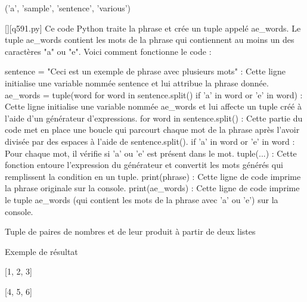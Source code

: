 ('a', 'sample', 'sentence', 'various')
        \par
        \begin{solution}
            \renewcommand{\nomfichier}{q591.py}
            \pythonfile{\chemincode \nomfichier}[][\nomfichier]
            Ce code Python traite la phrase et crée un tuple appelé ae_words. Le tuple ae_words contient les mots de la phrase qui contiennent au moins un des caractères "a" ou "e". Voici comment fonctionne le code :

    sentence = "Ceci est un exemple de phrase avec plusieurs mots" : Cette ligne initialise une variable nommée sentence et lui attribue la phrase donnée.
    ae_words = tuple(word for word in sentence.split() if 'a' in word or 'e' in word) : Cette ligne initialise une variable nommée ae_words et lui affecte un tuple créé à l'aide d'un générateur d'expressions.
        for word in sentence.split() : Cette partie du code met en place une boucle qui parcourt chaque mot de la phrase après l'avoir divisée par des espaces à l'aide de sentence.split().
        if 'a' in word or 'e' in word : Pour chaque mot, il vérifie si 'a' ou 'e' est présent dans le mot.
        tuple(...) : Cette fonction entoure l'expression du générateur et convertit les mots générés qui remplissent la condition en un tuple.
    print(phrase) : Cette ligne de code imprime la phrase originale sur la console.
    print(ae_words) : Cette ligne de code imprime le tuple ae_words (qui contient les mots de la phrase avec 'a' ou 'e') sur la console.
        \end{solution}
        

        \question
        Tuple de paires de nombres et de leur produit à partir de deux listes

Exemple de résultat

[1, 2, 3]

[4, 5, 6]

